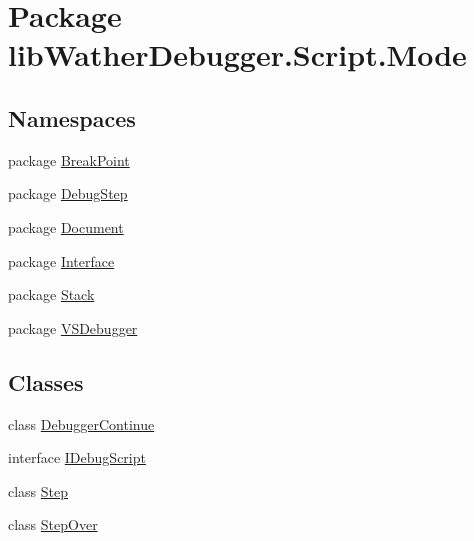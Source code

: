 \hypertarget{namespacelib_wather_debugger_1_1_script_1_1_mode}{\section{Package lib\+Wather\+Debugger.\+Script.\+Mode}
\label{namespacelib_wather_debugger_1_1_script_1_1_mode}
}
\subsection*{Namespaces}
\begin{DoxyCompactItemize}
\item 
package \hyperlink{namespacelib_wather_debugger_1_1_script_1_1_mode_1_1_break_point}{Break\+Point}
\item 
package \hyperlink{namespacelib_wather_debugger_1_1_script_1_1_mode_1_1_debug_step}{Debug\+Step}
\item 
package \hyperlink{namespacelib_wather_debugger_1_1_script_1_1_mode_1_1_document}{Document}
\item 
package \hyperlink{namespacelib_wather_debugger_1_1_script_1_1_mode_1_1_interface}{Interface}
\item 
package \hyperlink{namespacelib_wather_debugger_1_1_script_1_1_mode_1_1_stack}{Stack}
\item 
package \hyperlink{namespacelib_wather_debugger_1_1_script_1_1_mode_1_1_v_s_debugger}{V\+S\+Debugger}
\end{DoxyCompactItemize}
\subsection*{Classes}
\begin{DoxyCompactItemize}
\item 
class \hyperlink{classlib_wather_debugger_1_1_script_1_1_mode_1_1_debugger_continue}{Debugger\+Continue}
\item 
interface \hyperlink{interfacelib_wather_debugger_1_1_script_1_1_mode_1_1_i_debug_script}{I\+Debug\+Script}
\item 
class \hyperlink{classlib_wather_debugger_1_1_script_1_1_mode_1_1_step}{Step}
\item 
class \hyperlink{classlib_wather_debugger_1_1_script_1_1_mode_1_1_step_over}{Step\+Over}
\end{DoxyCompactItemize}
